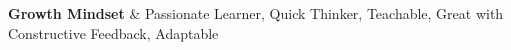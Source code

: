 \textbf{Growth Mindset} & 
Passionate Learner, 
Quick Thinker, 
Teachable, 
Great with Constructive Feedback, 
Adaptable